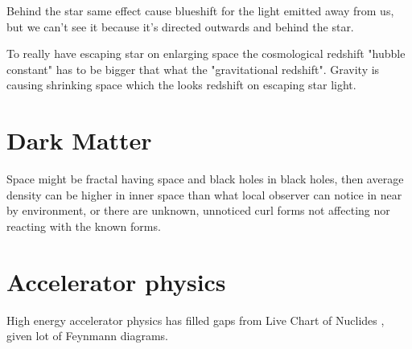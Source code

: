 Behind the star same effect cause blueshift for the light emitted away from
us, but we can't see it because it's directed outwards and behind the star.

To really have escaping star on enlarging space the cosmological redshift
"hubble constant" has to be bigger that what the "gravitational redshift".
Gravity is causing shrinking space which the looks redshift on escaping
star light.

\section{Dark Matter}
\label{dark_matter}

Space might be fractal having space and black holes in black holes, then
average density can be higher in inner space than what local observer can
notice in near by environment, or there are unknown, unnoticed curl forms
not affecting nor reacting with the known forms.


\section{Accelerator physics}
\label{accelerator_physics}

High energy accelerator physics has filled gaps from Live Chart of Nuclides
\cite{Nuclides}, given lot of Feynmann diagrams\allowbreak\cite{
FeynmannDiagram}.

